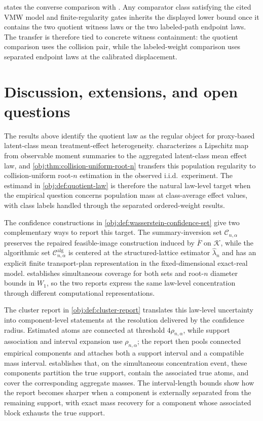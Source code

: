 \documentclass[11pt]{article}
\begin{document}
 states the converse comparison with \citet{VirkMazaheriWu2026}. Any comparator class satisfying the cited VMW model and finite-regularity gates inherits the displayed lower bound once it contains the two quotient witness laws or the two labeled-path endpoint laws. The transfer is therefore tied to concrete witness containment: the quotient comparison uses the collision pair, while the labeled-weight comparison uses separated endpoint laws at the calibrated displacement.


\section{Discussion, extensions, and open questions}

The results above identify the quotient law as the regular object for proxy-based latent-class mean treatment-effect heterogeneity.  characterizes a Lipschitz map from observable moment summaries to the aggregated latent-class mean effect law, and \cref{obj:thm:collision-uniform-root-n} transfers this population regularity to collision-uniform root-\(n\) estimation in the observed i.i.d.\ experiment. The estimand in \cref{obj:def:quotient-law} is therefore the natural law-level target when the empirical question concerns population mass at class-average effect values, with class labels handled through the separated ordered-weight results.

The confidence constructions in \cref{obj:def:wasserstein-confidence-set} give two complementary ways to report this target. The summary-inversion set \(\mathcal C_{n,\alpha}\) preserves the repaired feasible-image construction induced by \(\overline F\) on \(\mathcal K\), while the algorithmic set \(\mathcal C^{\mathrm{alg}}_{n,\alpha}\) is centered at the structured-lattice estimator \(\widehat\lambda_n\) and has an explicit finite transport-plan representation in the fixed-dimensional exact-real model.  establishes simultaneous coverage for both sets and root-\(n\) diameter bounds in \(W_1\), so the two reports express the same law-level concentration through different computational representations.

The cluster report in \cref{obj:def:cluster-report} translates this law-level uncertainty into component-level statements at the resolution delivered by the confidence radius. Estimated atoms are connected at threshold \(4\rho_{n,\alpha}\), while support association and interval expansion use \(\rho_{n,\alpha}\); the report then pools connected empirical components and attaches both a support interval and a compatible mass interval.  establishes that, on the simultaneous concentration event, these components partition the true support, contain the associated true atoms, and cover the corresponding aggregate masses. The interval-length bounds show how the report becomes sharper when a component is externally separated from the remaining support, with exact mass recovery for a component whose associated block exhausts the true support.
\end{document}
